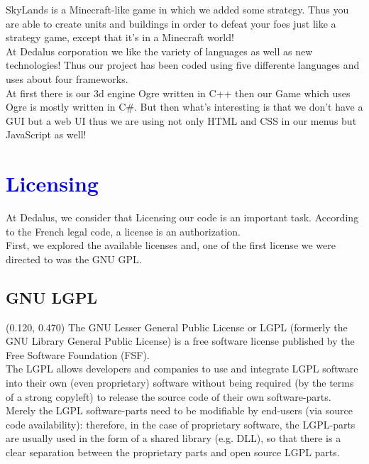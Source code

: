 \documentclass[article]{report}         %
\begin{document}
      SkyLands is a Minecraft-like game in which we added some strategy. Thus you are able to create units and buildings in order to defeat your foes just like a strategy game, except that it's in a Minecraft world!\\

      At Dedalus corporation we like the variety of languages as well as new technologies! Thus our project has been coded using five differente languages and uses about four frameworks.\\
      At first there is our 3d engine Ogre written in C++ then our Game which uses Ogre is mostly written in C\#. But then what's interesting is that we don't have a GUI but a web UI thus we are using not only HTML and CSS in our menus but JavaScript as well!

        \chapter{\textcolor{blue}{Licensing}}
          At Dedalus, we consider that Licensing our code is an important task. According to the French legal code, a license is an authorization.\\
          First, we explored the available licenses and, one of the first license we were directed to was the GNU GPL.

          \section{GNU LGPL}
            \begin{textblock}{0.475}(0.120, 0.470)
              The GNU Lesser General Public License or LGPL (formerly the GNU Library General Public License) is a free software license published by the Free Software Foundation (FSF). \\
              The LGPL allows developers and companies to use and integrate LGPL software into their own (even proprietary) software without being required (by the terms of a strong copyleft) to release the source code of their own software-parts. Merely the LGPL software-parts need to be modifiable by end-users (via source code availability): therefore, in the case of proprietary software, the LGPL-parts are usually used in the form of a shared library (e.g. DLL), so that there is a clear separation between the proprietary parts and open source LGPL parts.\\
          \end{textblock}
\end{document}
